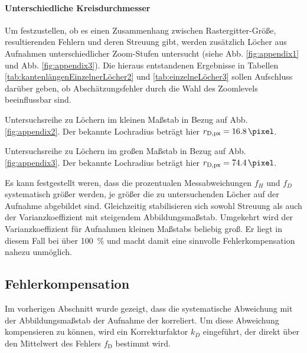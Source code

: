 \documentclass[accentcolor=tud1c, 11pt, toc=bib, toc=listof, captions=abovetable, parskip=half]{tudreport}
\begin{document}
\paragraph{Unterschiedliche Kreisdurchmesser}
Um festzustellen, ob es einen Zusammenhang zwischen Rastergitter-Größe, resultierenden Fehlern und deren Streuung gibt, werden zusätzlich Löcher aus Aufnahmen unterschiedlicher Zoom-Stufen untersucht (siehe Abb. \ref{fig:appendix1} und Abb. \ref{fig:appendix3}). Die hieraus entstandenen Ergebnisse in Tabellen \ref{tab:kantenlängenEinzelnerLöcher2} und \ref{tab:einzelneLöcher3} sollen Aufschluss darüber geben, ob Abschätzungsfehler durch die Wahl des Zoomlevels beeinflussbar sind.\\

\begin{table}[h!]
	\parbox{.45\linewidth}{
	\centering
	\caption{Untersuchsreihe zu Löchern im kleinen Maßstab in Bezug auf Abb. \ref{fig:appendix2}. Der bekannte Lochradius beträgt hier $r_{\text{D,px}} = \SI{16.8}{\pixel}$.}
	
	\label{tab:kantenlängenEinzelnerLöcher2}
	}
	\hfill
	\parbox{.45\linewidth}{
	\centering
	\caption{Untersuchsreihe zu Löchern im großen Maßstab in Bezug auf Abb. \ref{fig:appendix3}. Der bekannte Lochradius beträgt hier $r_{\text{D,px}} = \SI{74.4}{\pixel}$.} 
	
	\label{tab:einzelneLöcher3}
	}
\end{table}

Es kann festgestellt weren, dass die prozentualen Messabweichungen $f_H$ und $f_D$ systematisch größer werden, je größer die zu untersuchenden Löcher auf der Aufnahme abgebildet sind. Gleichzeitig stabilisieren sich sowohl Streuung als auch der Varianzkoeffizient mit steigendem Abbildungsmaßstab. Umgekehrt wird der Varianzkoeffizient für Aufnahmen kleinen Maßstabs beliebig groß. Er liegt in diesem Fall bei über \SI{100}{\percent} und macht damit eine sinnvolle Fehlerkompensation nahezu unmöglich.\\

\subsection{Fehlerkompensation}
Im vorherigen Abschnitt wurde gezeigt, dass die systematische Abweichung mit der Abbildungsmaßstab der Aufnahme der korreliert. Um diese Abweichung kompensieren zu können, wird ein Korrekturfaktor $k_D$ eingeführt, der direkt über den Mittelwert des Fehlers $f_{\text{D}}$ bestimmt wird.
\end{document}
